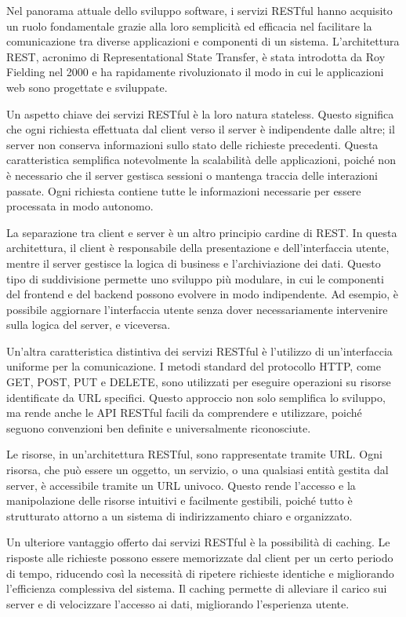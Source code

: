\documentclass[a4paper,twoside,12pt]{toptesi}
\begin{document}
Nel panorama attuale dello sviluppo software, i servizi RESTful hanno acquisito un ruolo fondamentale grazie alla loro semplicità ed efficacia nel facilitare la comunicazione tra diverse applicazioni e componenti di un sistema. L'architettura REST, acronimo di Representational State Transfer, è stata introdotta da Roy Fielding nel 2000 e ha rapidamente rivoluzionato il modo in cui le applicazioni web sono progettate e sviluppate.

Un aspetto chiave dei servizi RESTful è la loro natura stateless. Questo significa che ogni richiesta effettuata dal client verso il server è indipendente dalle altre; il server non conserva informazioni sullo stato delle richieste precedenti. Questa caratteristica semplifica notevolmente la scalabilità delle applicazioni, poiché non è necessario che il server gestisca sessioni o mantenga traccia delle interazioni passate. Ogni richiesta contiene tutte le informazioni necessarie per essere processata in modo autonomo.

La separazione tra client e server è un altro principio cardine di REST. In questa architettura, il client è responsabile della presentazione e dell'interfaccia utente, mentre il server gestisce la logica di business e l'archiviazione dei dati. Questo tipo di suddivisione permette uno sviluppo più modulare, in cui le componenti del frontend e del backend possono evolvere in modo indipendente. Ad esempio, è possibile aggiornare l'interfaccia utente senza dover necessariamente intervenire sulla logica del server, e viceversa.

Un'altra caratteristica distintiva dei servizi RESTful è l'utilizzo di un'interfaccia uniforme per la comunicazione. I metodi standard del protocollo HTTP, come GET, POST, PUT e DELETE, sono utilizzati per eseguire operazioni su risorse identificate da URL specifici. Questo approccio non solo semplifica lo sviluppo, ma rende anche le API RESTful facili da comprendere e utilizzare, poiché seguono convenzioni ben definite e universalmente riconosciute.

Le risorse, in un'architettura RESTful, sono rappresentate tramite URL. Ogni risorsa, che può essere un oggetto, un servizio, o una qualsiasi entità gestita dal server, è accessibile tramite un URL univoco. Questo rende l'accesso e la manipolazione delle risorse intuitivi e facilmente gestibili, poiché tutto è strutturato attorno a un sistema di indirizzamento chiaro e organizzato.

Un ulteriore vantaggio offerto dai servizi RESTful è la possibilità di caching. Le risposte alle richieste possono essere memorizzate dal client per un certo periodo di tempo, riducendo così la necessità di ripetere richieste identiche e migliorando l'efficienza complessiva del sistema. Il caching permette di alleviare il carico sui server e di velocizzare l'accesso ai dati, migliorando l'esperienza utente.
\end{document}
